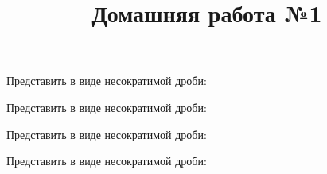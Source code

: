 \begin{listofex}
	\newpage
	\item Представить в виде несократимой дроби:
	\begin{enumcols}[itemcolumns=2]
		\item {}
		\item {}
		\item {}
		\item {}
		\item {}
		\item {}
	\end{enumcols}
	\item Представить в виде несократимой дроби:
	\begin{enumcols}[itemcolumns=2]
		\item {}
		\item {}
		\item {}
		\item {}
		\item {}
	\end{enumcols}
	\item Представить в виде несократимой дроби:
	\begin{enumcols}[itemcolumns=2]
		\item {}
		\item {}
		\item {}
		\item {}
		\item {}
		\item {}
		\item {}
		\item {}
	\end{enumcols}
	\item Представить в виде несократимой дроби:
	\begin{enumcols}[itemcolumns=3]
		\item {}
		\item {}
		\item {}
	\end{enumcols}
\end{listofex}
\newpage
\title{Домашняя работа №1}
